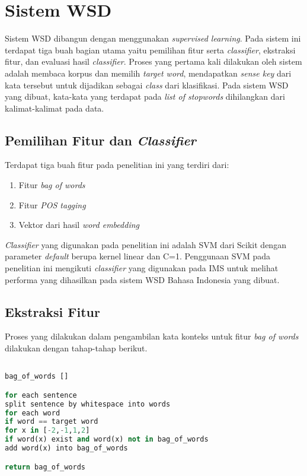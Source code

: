 \section{Sistem WSD}
Sistem WSD dibangun dengan menggunakan \textit{supervised learning}. Pada sistem ini terdapat tiga buah bagian utama yaitu pemilihan fitur serta \textit{classifier}, ekstraksi fitur, dan evaluasi hasil \textit{classifier}. Proses yang pertama kali dilakukan oleh sistem adalah membaca korpus dan memilih \textit{target word}, mendapatkan \textit{sense key} dari kata tersebut untuk dijadikan sebagai \textit{class} dari klasifikasi. Pada sistem WSD yang dibuat, kata-kata yang terdapat pada \textit{list of stopwords} dihilangkan dari kalimat-kalimat pada data.

\subsection{Pemilihan Fitur dan \textit{Classifier}}
Terdapat tiga buah fitur pada penelitian ini yang terdiri dari:

\begin{enumerate}
	\item Fitur \textit{bag of words}
	\item Fitur \textit{POS tagging}
	\item Vektor dari hasil \textit{word embedding}
\end{enumerate}

\textit{Classifier} yang digunakan pada penelitian ini adalah SVM dari Scikit \citep{scikit-learn} dengan parameter \textit{default} berupa kernel linear dan C=1. Penggunaan SVM pada penelitian ini mengikuti \textit{classifier} yang digunakan pada IMS \cite{zhong2010makes} untuk melihat performa yang dihasilkan pada sistem WSD Bahasa Indonesia yang dibuat.

\subsection{Ekstraksi Fitur}
Proses yang dilakukan dalam pengambilan kata konteks untuk fitur \textit{bag of words} dilakukan dengan tahap-tahap berikut.

\begin{lstlisting}[language=python,caption={Fitur Bag of Words}, label={fitur-bag-of-words}]

bag_of_words []

for each sentence
split sentence by whitespace into words
for each word
if word == target word
for x in [-2,-1,1,2]
if word(x) exist and word(x) not in bag_of_words
add word(x) into bag_of_words

return bag_of_words

\end{lstlisting}

